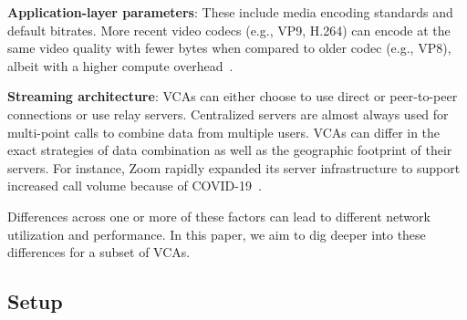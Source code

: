 \textbf{Application-layer parameters}: These include media encoding standards and default bitrates. More recent video codecs (e.g., VP9, H.264) can encode at the same video quality with fewer bytes when compared to older codec (e.g., VP8), albeit with a higher compute overhead~\cite{bienik2016performance}. %

\textbf{Streaming architecture}: VCAs can either choose to use direct or peer-to-peer connections or use relay servers. Centralized servers are almost always used for multi-point calls to combine data from multiple users. VCAs can differ in the exact strategies of data combination as well as the geographic footprint of their servers. For instance, Zoom rapidly expanded its server infrastructure to support increased call volume because of COVID-19~\cite{liu2020characterizing}. 


Differences across one or more of these factors can lead to different network utilization and performance. In this paper, we aim to dig deeper into these differences for a subset of VCAs. 














\subsection{Setup}



